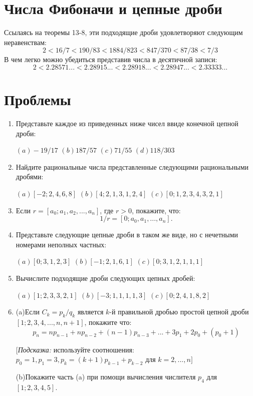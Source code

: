\documentclass[11pt]{article}
\begin{document}
		
		\section{Числа Фибоначи и цепные дроби}
		Ссылаясь на теоремы 13-8, эти подходящие дроби удовлетворяют следующим неравенствам:
		$$2<16/7<190/83<1884/823<847/370<87/38<7/3$$
		В чем легко можно убедиться представив числа в десятичной записи:
		$$2<2.28571...<2.28915...<2.28918...<2.28947...<2.33333...$$
		
	\section{Проблемы}
\noindent
\begin{enumerate}
\item Представьте каждое из приведенных ниже чисел ввиде конечной цепной дроби:
\begin{center}
$(a) -19/17$  $(b) 187/57$  $(c) 71/55$  $(d) 118/303$
			\end{center}
		\item Найдите рациональные числа представленные следующими рациональными дробями:
		\begin{center}
			$(a) [-2;2,4,6,8]$ $(b) [4;2,1,3,1,2,4]$ $(c) [0;1,2,3,4,3,2,1]$
					\end{center}
				\item Если $r=[a_0;a_1,a_2,...,a_n]$, где $r>0$, покажите, что:
				 $$1/r=[0;a_0,a_1,...,a_n].$$
				 \item Представьте следующие цепные дроби в таком же виде, но с нечетными номерами неполных частных:
			\begin{center}	
				$(a) [0;3,1,2,3]$ $(b) [-1;2,1,6,1]$ $(c) [0;3,1,2,1,1,1]$
			\end{center}	 
		\item Вычислите подходящие дроби следующих цепных дробей:
		\begin{center}
			$(a) [1;2,3,3,2,1]$ $(b) [-3;1,1,1,1,3]$ $(c) [0;2,4,1,8,2]$
		\end{center}
	\item (a)Если $C_k=p_k/q_k$ является $k$-й правильной дробью простой цепной дроби $[1;2,3,4,...,n,n+1]$, покажите что:
	$$p_n=np_{n-1}+np_{n-2}+(n-1)p_{n-3}+...+3p_1+2p_0+(p_0+1)$$
	\begin{center}
		[\textit{Подсказка:} используйте соотношения: $p_0=1,p_1=3,p_k=(k+1)p_{k-1}+p_{k-2}$ для $k=2,...,n]$
		\end{center}
	(b)Покажите часть (a) при помощи вычисления числителя $p_4$ для $[1;2,3,4,5]$.

\end{enumerate}
\end{document}
